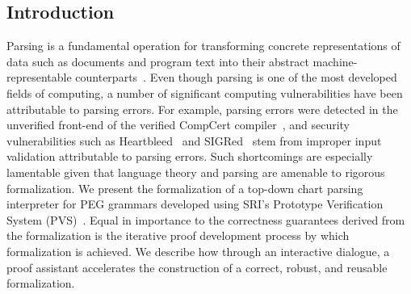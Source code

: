 \documentclass[sigplan,10pt,anonymous,review]{acmart}\settopmatter{printfolios=true,printccs=false,printacmref=false}
\begin{document}
\begin{CCSXML}


\section{Introduction}
\label{sec:intro}


Parsing is a fundamental operation for transforming concrete
representations of data such as documents and program text into their
abstract machine-representable counterparts~\cite{GruneJacobs}.  Even though parsing is
one of the most developed fields of computing, a number of significant
computing vulnerabilities have been attributable to parsing
errors. For example,  parsing errors were detected in the unverified
front-end of the verified CompCert
compiler~\cite{csmith}, and security vulnerabilities such as Heartbleed~\cite{carvalho2014heartbleed}  
and SIGRed~\cite{SIGRed} stem from improper input
validation attributable to parsing errors. Such shortcomings are
especially lamentable given that language theory and parsing are
amenable to rigorous formalization.   We present the formalization of a
top-down chart parsing interpreter for PEG grammars developed using
SRI's Prototype Verification System (PVS)~\cite{Owre95:prolegomena}.  Equal in importance to
the correctness guarantees derived from the formalization
is the iterative proof development process by which formalization is achieved.
We  describe how through an interactive dialogue, a proof
assistant accelerates the construction of a correct, robust, and
reusable formalization.




\end{CCSXML}
\end{document}
